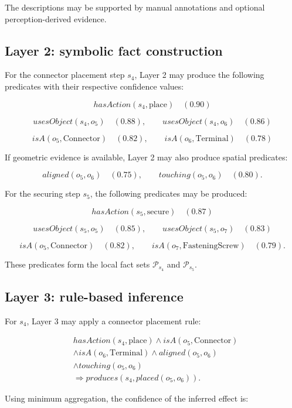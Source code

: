 The descriptions may be supported by manual annotations and optional perception-derived evidence.

\subsection{Layer 2: symbolic fact construction}

For the connector placement step $s_4$, Layer 2 may produce the following predicates with their respective confidence values:

\[
hasAction(s_4,\text{place}) \quad (0.90)
\]

\[
usesObject(s_4,o_5) \quad (0.88), \qquad usesObject(s_4,o_6) \quad (0.86)
\]

\[
isA(o_5,\text{Connector}) \quad (0.82), \qquad isA(o_6,\text{Terminal}) \quad (0.78)
\]

If geometric evidence is available, Layer 2 may also produce spatial predicates:

\[
aligned(o_5,o_6) \quad (0.75), \qquad touching(o_5,o_6) \quad (0.80).
\]

For the securing step $s_5$, the following predicates may be produced:

\[
hasAction(s_5,\text{secure}) \quad (0.87)
\]

\[
usesObject(s_5,o_5) \quad (0.85), \qquad usesObject(s_5,o_7) \quad (0.83)
\]

\[
isA(o_5,\text{Connector}) \quad (0.82), \qquad isA(o_7,\text{FasteningScrew}) \quad (0.79).
\]

These predicates form the local fact sets $\mathcal{P}_{s_4}$ and $\mathcal{P}_{s_5}$.

\subsection{Layer 3: rule-based inference}

For $s_4$, Layer 3 may apply a connector placement rule:

\[
\begin{aligned}
&hasAction(s_4,\text{place}) \wedge isA(o_5,\text{Connector}) \\
&\wedge isA(o_6,\text{Terminal}) \wedge aligned(o_5,o_6) \\
&\wedge touching(o_5,o_6) \\
&\Rightarrow produces(s_4, placed(o_5,o_6)).
\end{aligned}
\]

Using minimum aggregation, the confidence of the inferred effect is:

